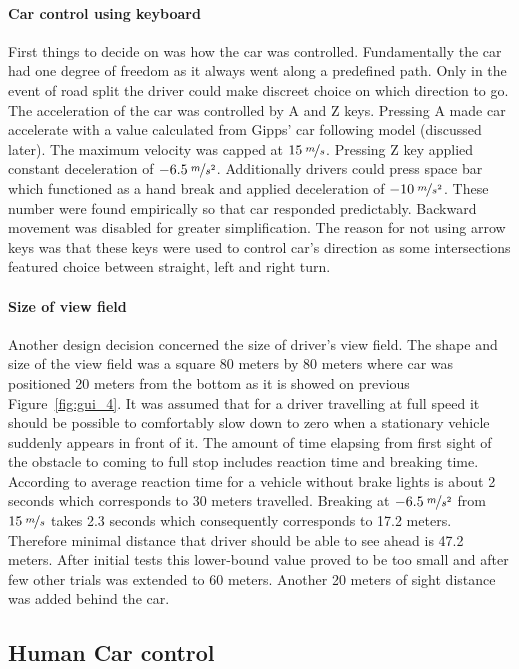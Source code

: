 \documentclass[11pt,english]{article}
\begin{document}
\paragraph{Car control using keyboard}
First things to decide on was how the car was controlled. Fundamentally the car had one degree of freedom as it always went along a predefined path. Only in the event of road split the driver could make discreet choice on which direction to go. The acceleration of the car was controlled by A and Z keys. Pressing A made car accelerate with a value calculated from Gipps' car following model (discussed later). The maximum velocity was capped at $15\:\nicefrac{m}{s}$. Pressing Z key applied constant deceleration of $-6.5\:\nicefrac{m}{s^2}$. Additionally drivers could press space bar which functioned as a hand break and applied deceleration of $-10\:\nicefrac{m}{s^2}$. These number were found empirically so that car responded predictably. Backward movement was disabled for greater simplification.
The reason for not using arrow keys was that these keys were used to control car's direction as some intersections featured choice between straight, left and right turn. 


\paragraph{Size of view field}
Another design decision concerned the size of driver's view field. The shape and size of the view field was a square 80 meters by 80 meters where car was positioned 20 meters from the bottom as it is showed on previous Figure~\ref{fig:gui_4}. It was assumed that for a driver travelling at full speed it should be possible to comfortably slow down to zero when a stationary vehicle suddenly appears in front of it. The amount of time elapsing from first sight of the obstacle to coming to full stop includes reaction time and breaking time. According to \citep{summala1998driving} average reaction time for a vehicle without brake lights is about 2 seconds which corresponds to 30 meters travelled. Breaking at $-6.5\:\nicefrac{m}{s^2}$ from $15\:\nicefrac{m}{s}$ takes 2.3 seconds which consequently corresponds to 17.2 meters. Therefore minimal distance that driver should be able to see ahead is 47.2 meters. After initial tests this lower-bound value proved to be too small and after few other trials was extended to 60 meters. Another 20 meters of sight distance was added behind the car. 




\subsection{Human Car control}
\end{document}
